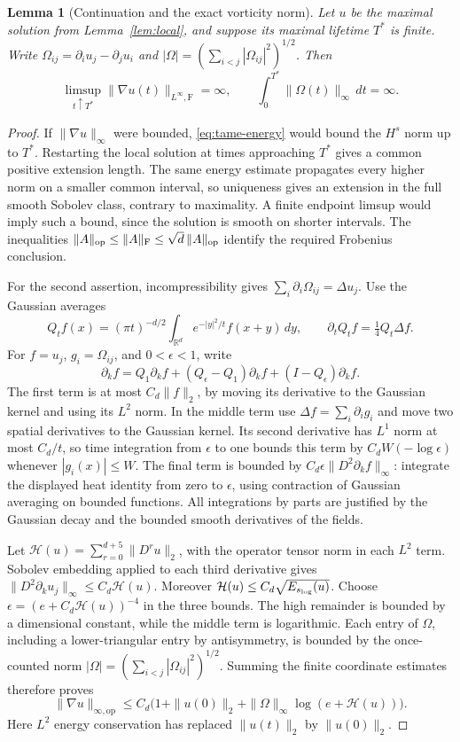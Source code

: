 \documentclass[11pt]{article}
\newcommand{\R}{\mathbb R}
\newtheorem{lemma}[theorem]{Lemma}
\theoremstyle{definition}
\begin{document}
\begin{lemma}[Continuation and the exact vorticity norm]\label{lem:continuation}
Let $u$ be the maximal solution from Lemma~\ref{lem:local}, and suppose
its maximal lifetime $T^*$ is finite. Write
$\Omega_{ij}=\partial_i u_j-\partial_j u_i$ and
$|\Omega|=(\sum_{i<j}|\Omega_{ij}|^2)^{1/2}$. Then
\[
 \limsup_{t\uparrow T^*}\|\nabla u(t)\|_{L^\infty,\mathrm F}=\infty,
 \qquad \int_0^{T^*}\|\Omega(t)\|_\infty\,dt=\infty.
\]
\end{lemma}
\begin{proof}
If $\|\nabla u\|_\infty$ were bounded, \eqref{eq:tame-energy} would
bound the $H^s$ norm up to $T^*$. Restarting the local solution at times
approaching $T^*$ gives a common positive extension length.
The same energy estimate propagates every higher norm on a smaller
common interval, so uniqueness gives an extension in the full smooth
Sobolev class, contrary to maximality. A finite endpoint limsup would
imply such a bound, since the solution is smooth on shorter intervals.
The inequalities $\|A\|_{\rm op}\leq\|A\|_{\rm F}\leq
\sqrt d\,\|A\|_{\rm op}$ identify the required Frobenius conclusion.

For the second assertion, incompressibility gives
$\sum_i\partial_i\Omega_{ij}=\Delta u_j$. Use the Gaussian averages
\[
 Q_tf(x)=(\pi t)^{-d/2}\int_{\R^d}e^{-|y|^2/t}f(x+y)\,dy,
 \qquad \partial_tQ_tf=\tfrac14 Q_t\Delta f.
\]
For $f=u_j$, $g_i=\Omega_{ij}$, and $0<\epsilon<1$, write
\[
 \partial_k f=Q_1\partial_k f+
       (Q_\epsilon-Q_1)\partial_k f+
       (I-Q_\epsilon)\partial_k f.
\]
The first term is at most $C_d\|f\|_2$, by moving its derivative to
the Gaussian kernel and using its $L^2$ norm. In the middle term use
$\Delta f=\sum_i\partial_i g_i$ and move two spatial derivatives to
the Gaussian kernel. Its second derivative has $L^1$ norm at most
$C_d/t$, so time integration from $\epsilon$ to one bounds this term by
$C_d W(-\log\epsilon)$ whenever $|g_i(x)|\leq W$.
The final term is bounded by
$C_d\epsilon\|D^2\partial_k f\|_\infty$: integrate the displayed heat
identity from zero to $\epsilon$, using contraction of Gaussian averaging
on bounded functions. All integrations by parts are justified by the
Gaussian decay and the bounded smooth derivatives of the fields.

Let
$\mathcal H(u)=\sum_{r=0}^{d+5}\|D^ru\|_2$, with the operator tensor
norm in each $L^2$ term. Sobolev embedding applied to each third derivative
gives $\|D^2\partial_k u_j\|_\infty\leq C_d\mathcal H(u)$.
Moreover $\mathcal H(u)\leq C_d\sqrt{E_{s_{\rm log}}(u)}$.
Choose $\epsilon=(e+C_d\mathcal H(u))^{-4}$ in the three bounds.
The high remainder is bounded by a dimensional constant, while the middle
term is logarithmic. Each entry of $\Omega$, including a lower-triangular
entry by antisymmetry, is bounded by the once-counted norm
$|\Omega|=(\sum_{i<j}|\Omega_{ij}|^2)^{1/2}$. Summing the finite
coordinate estimates therefore proves
\begin{equation}\label{eq:log-vorticity}
 \|\nabla u\|_{\infty,\mathrm{op}}\leq
 C_d\bigl(1+\|u(0)\|_2+
       \|\Omega\|_\infty\log(e+\mathcal H(u))\bigr).
\end{equation}
Here $L^2$ energy conservation has replaced $\|u(t)\|_2$ by
$\|u(0)\|_2$.


\end{proof}
\end{document}

